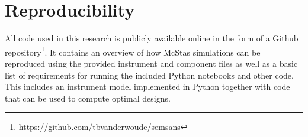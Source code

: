 \section{Reproducibility}
All code used in this research is publicly available online in the form of a Github repository\footnote{\url{https://github.com/tbvanderwoude/semsans}}. It contains an overview of how McStas simulations can be reproduced using the provided instrument and component files as well as a basic list of requirements for running the included Python notebooks and other code. This includes an instrument model implemented in Python together with code that can be used to compute optimal designs.